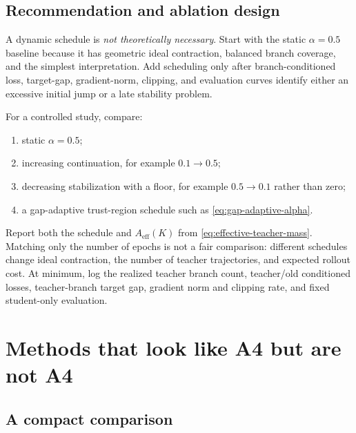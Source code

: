 \documentclass[11pt,a4paper]{article}
\theoremstyle{plain}
\theoremstyle{definition}
\begin{document}
\subsection{Recommendation and ablation design}

\begin{tcolorbox}[colback=green!5,colframe=green!50!black,title=Recommended default]
A dynamic schedule is \emph{not theoretically necessary}.  Start with the static
$\alpha=0.5$ baseline because it has geometric ideal contraction, balanced branch coverage, and
the simplest interpretation.  Add scheduling only after branch-conditioned loss, target-gap,
gradient-norm, clipping, and evaluation curves identify either an excessive initial jump or a
late stability problem.
\end{tcolorbox}

For a controlled study, compare:
\begin{enumerate}[leftmargin=1.6em]
\item static $\alpha=0.5$;
\item increasing continuation, for example $0.1\rightarrow0.5$;
\item decreasing stabilization with a floor, for example $0.5\rightarrow0.1$ rather than zero;
\item a gap-adaptive trust-region schedule such as \eqref{eq:gap-adaptive-alpha}.
\end{enumerate}
Report both the schedule and $A_{\mathrm{eff}}(K)$ from
\eqref{eq:effective-teacher-mass}.  Matching only the number of epochs is not a fair comparison:
different schedules change ideal contraction, the number of teacher trajectories, and expected
rollout cost.  At minimum, log the realized teacher branch count, teacher/old conditioned losses,
teacher-branch target gap, gradient norm and clipping rate, and fixed student-only evaluation.

\section{Methods that look like A4 but are not A4}
\label{sec:not-a4}

\subsection{A compact comparison}
\end{document}

